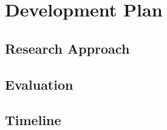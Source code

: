 \chapter{Development Plan}
\label{chap:Chapter5}
\section{Research Approach}

\section{Evaluation}

\section{Timeline}
